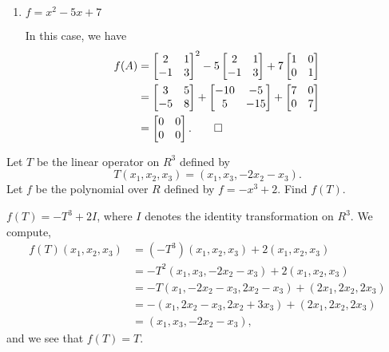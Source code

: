 \begin{enumerate}
\item $f = x^2 - 5x + 7$
  \begin{solution}
    In this case, we have
    \begin{align*}
      f(A)
      &=
      \begin{bmatrix}
        2 & 1 \\
        -1 & 3
      \end{bmatrix}^2
      - 5
      \begin{bmatrix}
        2 & 1 \\
        -1 & 3
      \end{bmatrix}
      + 7
      \begin{bmatrix}
        1 & 0 \\
        0 & 1
      \end{bmatrix} \\
      &=
      \begin{bmatrix}
        3 & 5 \\
        -5 & 8
      \end{bmatrix}
      +
      \begin{bmatrix}
        -10 & -5 \\
        5 & -15
      \end{bmatrix}
      +
      \begin{bmatrix}
        7 & 0 \\
        0 & 7
      \end{bmatrix} \\
      &=
      \begin{bmatrix}
        0 & 0 \\
        0 & 0
      \end{bmatrix}. \qedhere
    \end{align*}
  \end{solution}
\end{enumerate}

 Let $T$ be the linear operator on $R^3$ defined by
\begin{equation*}
  T(x_1, x_2, x_3) = (x_1, x_3, -2x_2 - x_3).
\end{equation*}
Let $f$ be the polynomial over $R$ defined by $f = -x^3 + 2$. Find
$f(T)$.
\begin{solution}
  $f(T) = -T^3 + 2I$, where $I$ denotes the identity transformation on
  $R^3$. We compute,
  \begin{align*}
    f(T)(x_1,x_2,x_3)
    &= (-T^3)(x_1,x_2,x_3) + 2(x_1,x_2,x_3) \\
    &= -T^2(x_1, x_3, -2x_2 - x_3) + 2(x_1,x_2,x_3) \\
    &= -T(x_1, -2x_2 - x_3, 2x_2 - x_3) + (2x_1,2x_2,2x_3) \\
    &= -(x_1, 2x_2 - x_3, 2x_2 + 3x_3) + (2x_1,2x_2,2x_3) \\
    &= (x_1, x_3, -2x_2 - x_3),
  \end{align*}
  and we see that $f(T) = T$.
\end{solution}

